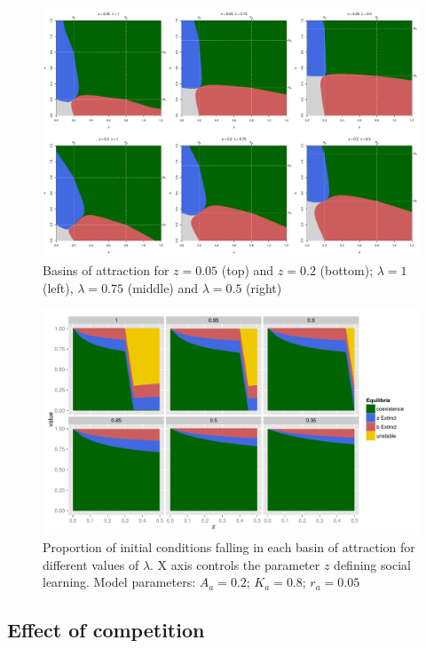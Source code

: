 \documentclass[review,authoryear]{elsarticle}
\begin{document}
\begin{figure}
  \centering
      \includegraphics[width=\textwidth]{./figures/figure5}
  \caption{Basins of attraction for $z=0.05$ (top) and $z=0.2$ (bottom); $\lambda=1$ (left), $\lambda=0.75$ (middle) and $\lambda=0.5$ (right)}
    \label{fig:overlap}
\end{figure}

\begin{figure}
  \centering
      \includegraphics[width=\textwidth]{./figures/figure6}
  \caption{Proportion of initial conditions falling in each basin of attraction for different values of $\lambda$. X axis controls the parameter $z$ defining social learning. Model parameters: $A_a=0.2$; $K_a=0.8$; $r_a=0.05$}
    \label{fig:percentages}
\end{figure}

\subsection{Effect of competition}
\end{document}
